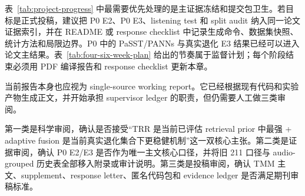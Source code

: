\begin{table}[H]
	\centering
	\caption{TMM 提交包收束节奏。}
	\label{tab:four-six-week-plan}
	\scriptsize
\end{table}

表~\ref{tab:project-progress} 中最需要优先处理的是主证据冻结和提交包卫生。若目标是正式投稿，建议把 P0 E2、P0 E3、listening test 和 split audit 纳入同一论文证据索引，并在 README 或 response checklist 中记录生成命令、数据集快照、统计方法和局限边界。P0 中的 PaSST/PANNs 与真实退化 E3 结果已经可以进入论文主结果。表~\ref{tab:four-six-week-plan} 给出的节奏属于监督计划；每个阶段结束必须用 PDF 编译报告和 response checklist 更新本章。

当前报告本身也应视为 single-source working report。它已经根据现有代码和实验产物生成正文，并开始承担 supervisor ledger 的职责，但仍需要人工做三类审阅。

第一类是科学审阅，确认是否接受“TRR 是当前已评估 retrieval prior 中最强 + adaptive fusion 是当前真实退化集合下更稳健机制”这一双核心主张。第二类是证据审阅，确认 P0 E2/E3 是否作为唯一主文核心口径，并将旧 211 口径与 audio-grouped 历史表全部移入附录或审计说明。第三类是投稿审阅，确认 TMM 主文、supplement、response letter、匿名代码包和 evidence ledger 是否满足期刊审稿标准。
